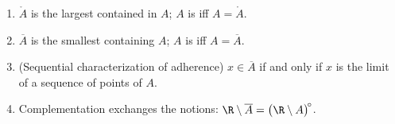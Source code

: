 \begin{proposition}\label{prop:b1:topology:closureprops}
\begin{enumerate}
  \item $\mathring A$ is the largest  contained in $A$; $A$
        is  iff $A = \mathring A$.
  \item $\overline A$ is the smallest  containing $A$; $A$
        is  iff $A = \overline A$.
  \item (Sequential characterization of adherence) $x \in \overline
        A$ if and only if $x$ is the limit of a sequence of points of
        $A$.
  \item Complementation exchanges the notions: $\R \setminus
        \overline A = \bigl(\R \setminus A\bigr)^{\!\circ}$.
\end{enumerate}
\end{proposition}

